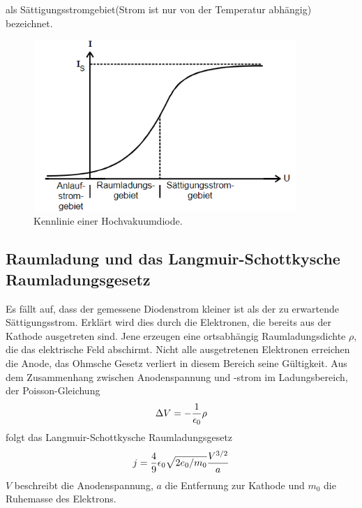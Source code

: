 als Sättigungsstromgebiet(Strom ist nur von der Temperatur abhängig) bezeichnet.
\begin{figure}[H]
    \begin{center}
    \includegraphics[width = 10cm, height= 6.5cm]{KennlinienHochvakuum.png}
    \caption{Kennlinie einer Hochvakuumdiode.\protect\cite{AL}}
    \end{center}
    \label{fig:KennlinienHochvakuum}
    \end{figure}
    \noindent
\subsection{ Raumladung und das Langmuir-Schottkysche Raumladungsgesetz}
Es fällt auf, dass der gemessene Diodenstrom kleiner ist als der zu erwartende Sättigungsstrom. Erklärt wird dies durch die Elektronen, die bereits aus der Kathode ausgetreten
sind. Jene erzeugen eine ortsabhängig Raumladungsdichte $\rho$, die das elektrische Feld
abschirmt. Nicht alle ausgetretenen Elektronen erreichen die Anode, das Ohmsche Gesetz
verliert in diesem Bereich seine Gültigkeit. Aus dem Zusammenhang zwischen Anodenspannung und -strom im Ladungsbereich, der Poisson-Gleichung
\begin{equation}
\Delta V = - \frac{1}{\epsilon _0} \rho\\
\end{equation}
\noindent
folgt das Langmuir-Schottkysche Raumladungsgesetz
\begin{equation}
j= \frac{4}{9} \epsilon_0 \sqrt{2e_0/m_0} \frac{V^{3/2}}{a}\\
\end{equation}
\noindent $V$ beschreibt die Anodenspannung, $a$ die Entfernung zur Kathode und $m_0$ die Ruhemasse
des Elektrons.
